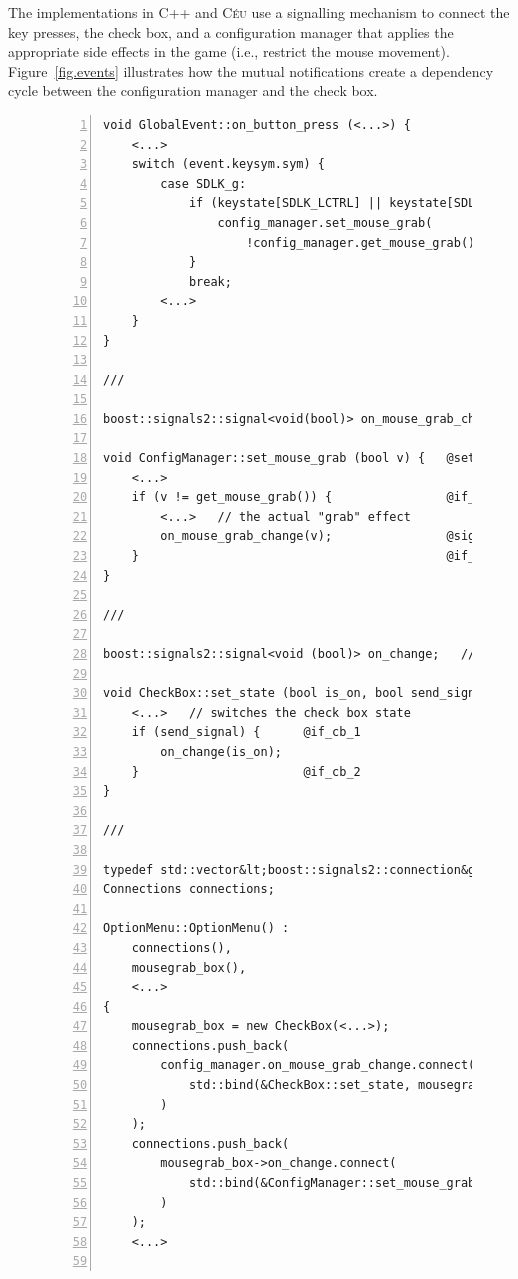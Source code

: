 \documentclass{vgtc}                          %
\newcommand{\CEU}{\textsc{C\'{e}u}\xspace}
\begin{document}
The implementations in C++ and \CEU use a signalling mechanism to connect the
key presses, the check box, and a configuration manager that applies the
appropriate side effects in the game (i.e., restrict the mouse movement).
Figure~\ref{fig.events} illustrates how the mutual notifications create a 
dependency cycle between the configuration manager and the check box.

\begin{figure}
\begin{minipage}[t]{0.50\linewidth}
\begin{lstlisting}[numbers=left,xleftmargin=3em]
void GlobalEvent::on_button_press (<...>) {
    <...>
    switch (event.keysym.sym) {
        case SDLK_g:
            if (keystate[SDLK_LCTRL] || keystate[SDLK_RCTRL]) {
                config_manager.set_mouse_grab(          @ctrl_g_cpp
                    !config_manager.get_mouse_grab());
            }
            break;
        <...>
    }
}

///

boost::signals2::signal<void(bool)> on_mouse_grab_change;   // definition in `config_manager.h` @signal_def

void ConfigManager::set_mouse_grab (bool v) {   @set_mouse_grab
    <...>
    if (v != get_mouse_grab()) {                @if_1
        <...>   // the actual "grab" effect
        on_mouse_grab_change(v);                @signal
    }                                           @if_2
}

///

boost::signals2::signal<void (bool)> on_change;   // definition in `check_box.hpp`

void CheckBox::set_state (bool is_on, bool send_signal) {   @last_argument
    <...>   // switches the check box state
    if (send_signal) {      @if_cb_1
        on_change(is_on);
    }                       @if_cb_2
}

///

typedef std::vector&lt;boost::signals2::connection&gt; Connections;   // definition in `option_menu.hpp`
Connections connections;                                        // definition in `option_menu.hpp`

OptionMenu::OptionMenu() :
    connections(),
    mousegrab_box(),
    <...>
{
    mousegrab_box = new CheckBox(<...>);
    connections.push_back(                              @bind_11
        config_manager.on_mouse_grab_change.connect(
            std::bind(&CheckBox::set_state, mousegrab_box, <...>, false); @bind_false
        )
    );                                                  @bind_12
    connections.push_back(                              @bind_21
        mousegrab_box->on_change.connect(
            std::bind(&ConfigManager::set_mouse_grab, &config_manager, <...>);
        )
    );                                                  @bind_22
    <...>


\end{lstlisting}
\end{minipage}
\end{figure}
\end{document}
